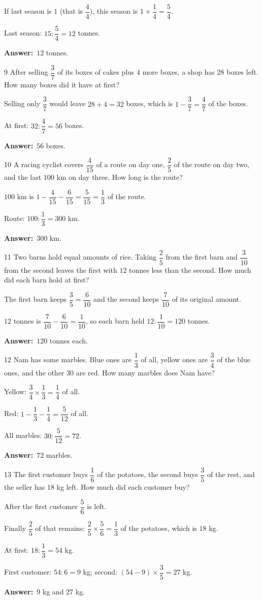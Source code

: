 \documentclass[11pt]{article}
\newif\ifsol \solfalse
\providecommand{\AnsWord}{Đáp số}
\newcommand{\dapso}[1]{\par\textbf{\AnsWord:}\ #1}
\newcommand{\probsol}[1]{%
  \begin{lrbox}{\solmeasure}\begin{minipage}{\dimexpr\linewidth-24pt\relax}#1\end{minipage}\end{lrbox}%
  \ifsol
    \begin{solbox}#1\end{solbox}%
  \else
    \setlength{\solht}{\dimexpr\ht\solmeasure+\dp\solmeasure+0.85cm\relax}%
    \ifdim\solht<1.35cm\setlength{\solht}{1.35cm}\fi
    \begin{tcolorbox}[colback=white,colframe=Line,boxrule=0.8pt,arc=5pt,
      left=8pt,right=8pt,top=4pt,bottom=4pt,height=\solht]{\footnotesize\color{Slate}\itshape\WorkWord}\end{tcolorbox}%
  \fi}
\newcommand{\gap}{\vspace{0.3cm}}
\def\WorkWord{Your work:}
\def\AnsWord{Answer}
\begin{document}
\probsol{
If last season is $1$ (that is $\dfrac44$), this season is $1+\dfrac14=\dfrac54$.\par
Last season: $15:\dfrac54=12$ tonnes.
\dapso{$12$ tonnes.}}
\gap
\begin{probbox}{9}{\relax}
After selling $\dfrac37$ of its boxes of cakes plus $4$ more boxes, a shop has $28$ boxes left. How many boxes did it have at first?
\end{probbox}
\probsol{
Selling only $\dfrac37$ would leave $28+4=32$ boxes, which is $1-\dfrac37=\dfrac47$ of the boxes.\par
At first: $32:\dfrac47=56$ boxes.
\dapso{$56$ boxes.}}
\gap
\begin{probbox}{10}{\relax}
A racing cyclist covers $\dfrac4{15}$ of a route on day one, $\dfrac25$ of the route on day two, and the last $100$ km on day three. How long is the route?
\end{probbox}
\probsol{
$100$ km is $1-\dfrac4{15}-\dfrac6{15}=\dfrac5{15}=\dfrac13$ of the route.\par Route: $100:\dfrac13=300$ km.
\dapso{$300$ km.}}
\gap
\begin{probbox}{11}{\relax}
Two barns hold equal amounts of rice. Taking $\dfrac25$ from the first barn and $\dfrac3{10}$ from the second leaves the first with $12$ tonnes less than the second. How much did each barn hold at first?
\end{probbox}
\probsol{
The first barn keeps $\dfrac35=\dfrac6{10}$ and the second keeps $\dfrac7{10}$ of its original amount.\par
$12$ tonnes is $\dfrac7{10}-\dfrac6{10}=\dfrac1{10}$, so each barn held $12:\dfrac1{10}=120$ tonnes.
\dapso{$120$ tonnes each.}}
\gap
\begin{probbox}{12}{\relax}
Nam has some marbles. Blue ones are $\dfrac13$ of all, yellow ones are $\dfrac34$ of the blue ones, and the other $30$ are red. How many marbles does Nam have?
\end{probbox}
\probsol{
Yellow: $\dfrac34\times\dfrac13=\dfrac14$ of all.\par Red: $1-\dfrac13-\dfrac14=\dfrac5{12}$ of all.\par
All marbles: $30:\dfrac5{12}=72$.
\dapso{$72$ marbles.}}
\gap
\begin{probbox}{13}{\relax}
The first customer buys $\dfrac16$ of the potatoes, the second buys $\dfrac35$ of the rest, and the seller has $18$ kg left. How much did each customer buy?
\end{probbox}
\probsol{
After the first customer $\dfrac56$ is left.\par Finally $\dfrac25$ of that remains: $\dfrac25\times\dfrac56=\dfrac13$ of the potatoes, which is $18$ kg.\par
At first: $18:\dfrac13=54$ kg.\par First customer: $54:6=9$ kg; second: $(54-9)\times\dfrac35=27$ kg.
\dapso{$9$ kg and $27$ kg.}}
\end{document}
